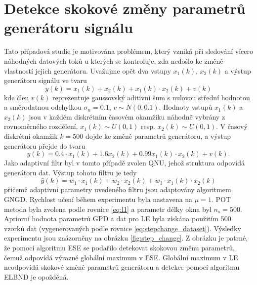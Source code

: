 \section{Detekce skokové změny parametrů generátoru signálu}\label{chap:mdpi_stepchange}
Tato případová studie je motivována problémem, který vzniká při sledování vícero náhodných datových toků \cite{stepchange} u kterých se kontroluje, zda nedošlo ke změně vlastností jejich generátoru. Uvažujme opět dva vstupy $x_1(k)$, $x_2(k)$ a výstup generátoru signálu ve tvaru
\begin{equation}
y(k)=x_1(k)+x_2(k)+x_1(k)\cdot x_2(k) + v(k)
\end{equation} 
kde člen $v(k)$ reprezentuje gaussovský aditivní šum s nulovou střední hodnotou a směrodatnou odchylkou $\sigma_n=0.1$, $v \sim N(0,0.1)$. Hodnoty vstupů $x_1(k)$ a $x_2(k)$ jsou v každém diskrétním časovém okamžiku náhodně vybrány z rovnoměrného rozdělení, $x_1(k) \sim U(0,1)$ resp. $x_2(k) \sim U(0,1)$. V časový diskrétní okamžik $k=500$ dojde ke změně parametrů generátoru, a výstup generátoru přejde do tvaru
\begin{equation}\label{eq:stepchange_dataset}
y(k)=0.4\cdot x_1(k) + 1.6x_2(k)+0.99x_1(k)\cdot x_2(k) + v(k).
\end{equation}
Jako adaptivní filtr byl v tomto případě zvolen QNU, jehož struktura odpovídá generátoru dat. Výstup tohoto filtru je tedy
\begin{equation}
\hat{y}(k)=w_1\cdot x_1(k)+w_2\cdot x_2(k)+w_3\cdot x_1(k)\cdot x_2(k)
\end{equation}
přičemž adaptivní parametry uvedeného filtru jsou adaptovány algoritmem GNGD. Rychlost učení během experimentu byla nastavena na $\mu=1$. POT metoda byla zvolena podle rovnice \ref{eq:l1} a parametr délky okna byl $n_s=500$. Apriorní hodnota parametrů GPD a dat pro LE byla získána použitím 500 vzorků dat (vygenerovaných podle rovnice \ref{eq:stepchange_dataset}). Výsledky experimentu jsou znázorněny na obrázku \ref{fig:step_change}. Z obrázku je patrné, že pomocí algoritmu ESE se podařilo detekovat skokovou změnu parametrů, čemuž odpovídá výrazné globální maximum v ESE. Globální maximum v LE neodpovídá skokové změně parametrů generátoru a detekce pomocí algoritmu ELBND je opožděná.

